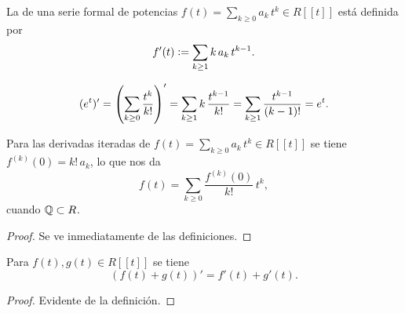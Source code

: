 \documentclass{article}
\numberwithin{equation}{section}
\theoremstyle{definition}
\begin{document}
\begin{definicion}
  La  de una serie formal de potencias
  $f (t) = \sum_{k \ge 0} a_k\,t^k \in R [\![t]\!]$ está definida por
  $$f' (t) \mathrel{\mathop:}= \sum_{k \ge 1} k\,a_k\,t^{k-1}.$$
\end{definicion}

\begin{ejemplo}
  \[ (e^t)' = \left(\sum_{k \ge 0} \frac{t^k}{k!}\right)' =
    \sum_{k \ge 1} k\,\frac{t^{k-1}}{k!} =
    \sum_{k \ge 1} \frac{t^{k-1}}{(k-1)!} = e^t. \qedhere \]
\end{ejemplo}

\begin{observacion}
  \label{serie-de-Taylor-formal}
  Para las derivadas iteradas de
  $f (t) = \sum_{k \ge 0} a_k \, t^k \in R [\![t]\!]$ se tiene
  $f^{(k)} (0) = k! \, a_k$, lo que nos da
  $$f (t) = \sum_{k \ge 0} \frac{f^{(k)} (0)}{k!}\,t^k,$$
  cuando $\mathbb{Q} \subset R$.

  \begin{proof}
    Se ve inmediatamente de las definiciones.
  \end{proof}
\end{observacion}

\begin{observacion}
  Para $f (t), g (t) \in R [\![t]\!]$ se tiene
  $$(f (t) + g (t))' = f' (t) + g' (t).$$

  \begin{proof}
    Evidente de la definición.
  \end{proof}
\end{observacion}
\end{document}
